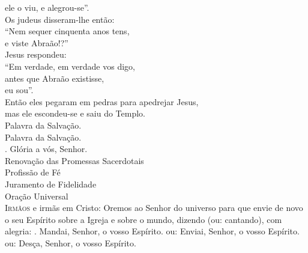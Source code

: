 \documentclass{book}
\begin{document}
\begin{flushleft}
    ele o viu, e alegrou-se''. \\
    Os judeus disseram-lhe então: \\
    ``Nem sequer cinquenta anos tens, \\
    e viste Abraão!?'' \\
    Jesus respondeu: \\
    ``Em verdade, em verdade vos digo, \\
    antes que Abraão existisse, \\
    eu sou''. \\
    Então eles pegaram em pedras para apedrejar Jesus, \\
    mas ele escondeu-se e saiu do Templo. \\
    Palavra da Salvação.
    \vspace{.2cm} \\
    Palavra da Salvação. \\
    {\color{VioletRed2} \Rbar.} Glória a vós, Senhor.
    \vspace{.2cm} \\
    \textcolor{VioletRed2}{Renovação das Promessas Sacerdotais}
    \vspace{.2cm} \\
    \textcolor{VioletRed2}{Profissão de Fé}
    \vspace{.2cm} \\
    \textcolor{VioletRed2}{Juramento de Fidelidade}
    \vspace{.2cm} \\
    \textcolor{VioletRed2}{Oração Universal}
    \vspace{.2cm} \\
    \lettrine[findent=2pt]{\color{VioletRed2}I}{rmãos} e irmãs em Cristo:
    \newline
    Oremos ao Senhor do universo
    \newline
    para que envie de novo o seu Espírito
    \newline
    sobre a Igreja e sobre o mundo,
    \newline
    dizendo \textcolor{VioletRed2}{(ou:} cantando\textcolor{VioletRed2}{)}, com alegria:
    \vspace{.2cm}
    \newline
    {\color{VioletRed2} \Rbar.} Mandai, Senhor, o vosso Espírito.
    \newline
    \textcolor{VioletRed2}{ou:} Enviai, Senhor, o vosso Espírito.
    \newline
    \textcolor{VioletRed2}{ou:} Desça, Senhor, o vosso Espírito.

\end{flushleft}
\end{document}
